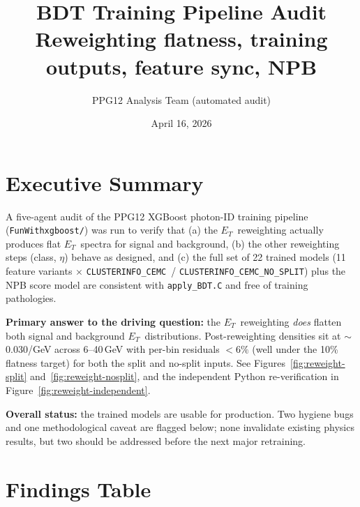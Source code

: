 \documentclass[11pt,a4paper]{article}
\title{BDT Training Pipeline Audit\\
\large Reweighting flatness, training outputs, feature sync, NPB}
\author{PPG12 Analysis Team (automated audit)}
\date{April 16, 2026}
\newcommand{\etg}{$E_T$}
\newcommand{\splitnode}{\texttt{CLUSTERINFO\_CEMC}}
\newcommand{\nosplitnode}{\texttt{CLUSTERINFO\_CEMC\_NO\_SPLIT}}
\begin{document}
\maketitle

\section*{Executive Summary}

A five-agent audit of the PPG12 XGBoost photon-ID training pipeline
(\texttt{FunWithxgboost/}) was run to verify that
(a) the \etg\ reweighting actually produces flat \etg\ spectra for
signal and background,
(b) the other reweighting steps (class, $\eta$) behave as designed, and
(c) the full set of 22 trained models (11 feature variants
$\times$ \splitnode\ / \nosplitnode) plus the NPB score model are
consistent with \texttt{apply\_BDT.C} and free of training pathologies.

\textbf{Primary answer to the driving question:} the \etg\ reweighting
\emph{does} flatten both signal and background \etg\ distributions.
Post-reweighting densities sit at $\sim$0.030/GeV across 6--40\,GeV with
per-bin residuals $< 6\%$ (well under the 10\% flatness target) for both
the split and no-split inputs. See
Figures~\ref{fig:reweight-split} and~\ref{fig:reweight-nosplit}, and the
independent Python re-verification in
Figure~\ref{fig:reweight-independent}.

\textbf{Overall status:} the trained models are usable for production.
Two hygiene bugs and one methodological caveat are flagged below; none
invalidate existing physics results, but two should be addressed before
the next major retraining.

\section{Findings Table}
\end{document}
